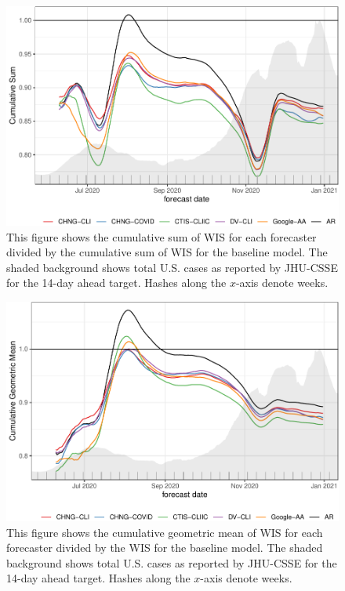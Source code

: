 \documentclass[9pt,twoside,lineno]{pnas-new}
\begin{document}
\clearpage

\begin{figure}

{\centering \includegraphics[width=\textwidth]{fig/cumulative-mean-1} 

}

\caption{This figure shows the cumulative sum of WIS for each forecaster divided by the cumulative sum of WIS for the baseline model. The shaded background shows total U.S. cases as reported by JHU-CSSE for the 14-day ahead target. Hashes along the $x$-axis denote weeks.}\label{fig:cumulative-mean}
\end{figure}

\clearpage

\begin{figure}

{\centering \includegraphics[width=\textwidth]{fig/cumulative-geo-mean-1} 

}

\caption{This figure shows the cumulative geometric mean of WIS for each forecaster divided by the WIS for the baseline model. The shaded background shows total U.S. cases as reported by JHU-CSSE for the 14-day ahead target. Hashes along the $x$-axis denote weeks.}\label{fig:cumulative-geo-mean}
\end{figure}
\end{document}
